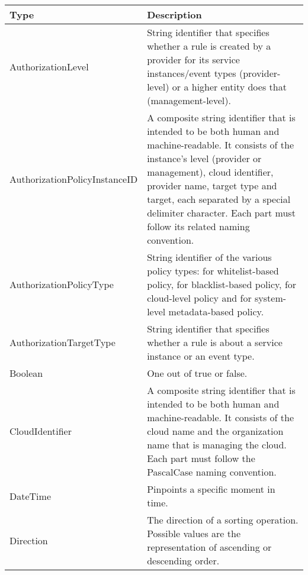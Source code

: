 \documentclass[a4paper]{arrowhead}
\newcommand{\pdef}[1]{{\textcolor{ArrowheadGrey}{#1\label{sec:model:primitives:#1}\label{sec:model:primitives:#1s}\label{sec:model:primitives:#1es}}}}
\begin{document}
\begin{table}[ht!]
\begin{tabularx}{\textwidth}{| p{5cm} | X |} \hline
\rowcolor{gray!33} Type & Description \\ \hline
\pdef{AuthorizationLevel} & String identifier that specifies whether a rule is created by a provider for its service instances/event types (provider-level) or a higher entity does that (management-level). \\ \hline
\pdef{AuthorizationPolicyInstanceID} & A composite string identifier that is intended to be both human and machine-readable. It consists of the instance's level (provider or management), cloud identifier, provider name, target type and target, each separated by a special delimiter character. Each part must follow its related naming convention. \\ \hline
\pdef{AuthorizationPolicyType} & String identifier of the various policy types: for whitelist-based policy, for blacklist-based policy, for cloud-level policy and for system-level metadata-based policy. \\ \hline
\pdef{AuthorizationTargetType} & String identifier that specifies whether a rule is about a service instance or an event type. \\ \hline
\pdef{Boolean}          & One out of true or false. \\ \hline
\pdef{CloudIdentifier} & A composite string identifier that is intended to be both human and machine-readable. It consists of the cloud name and the organization name that is managing the cloud. Each part must follow the PascalCase naming convention. \\ \hline
\pdef{DateTime}         & Pinpoints a specific moment in time. \\ \hline
\pdef{Direction}        & The direction of a sorting operation. Possible values are the representation of ascending or descending order. \\ \hline
\end{tabularx}
\end{table}
\end{document}
